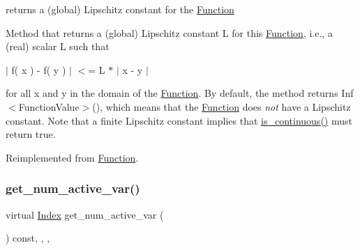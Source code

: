 returns a (global) Lipschitz constant for the \mbox{\hyperlink{class_s_m_spp__di__unipi__it_1_1_function}{Function}} 

Method that returns a (global) Lipschitz constant L for this \mbox{\hyperlink{class_s_m_spp__di__unipi__it_1_1_function}{Function}}, i.\+e., a (real) scalar L such that

$\vert$ f( x ) -\/ f( y ) $\vert$ $<$= L $\ast$ $\vert$ x -\/ y $\vert$

for all x and y in the domain of the \mbox{\hyperlink{class_s_m_spp__di__unipi__it_1_1_function}{Function}}. By default, the method returns Inf$<$\+Function\+Value$>$(), which means that the \mbox{\hyperlink{class_s_m_spp__di__unipi__it_1_1_function}{Function}} does {\itshape not} have a Lipschitz constant. Note that a finite Lipschitz constant implies that \mbox{\hyperlink{class_s_m_spp__di__unipi__it_1_1_function_a59de57710aa301d293e9126e3fb975bf}{is\+\_\+continuous()}} must return true. 

Reimplemented from \mbox{\hyperlink{class_s_m_spp__di__unipi__it_1_1_function_a472422601268368c33568731d4bb0f19}{Function}}.

\mbox{\label{class_s_m_spp__di__unipi__it_1_1_linear_function_a9e4e36559af1c5c8ecac72598b9fea4c}} 
\subsubsection{\texorpdfstring{get\+\_\+num\+\_\+active\+\_\+var()}{get\_num\_active\_var()}}
{\footnotesize\ttfamily virtual \mbox{\hyperlink{group___thin_var_dep_interface___c_l_a_s_s_e_s_gad53d6229d7ec28555a9c9c2fd9abf773}{Index}} get\+\_\+num\+\_\+active\+\_\+var (\begin{DoxyParamCaption}\item[{void}]{ }\end{DoxyParamCaption}) const\hspace{0.3cm}{\ttfamily [inline]}, {\ttfamily [final]}, {\ttfamily [override]}, {\ttfamily [virtual]}}



